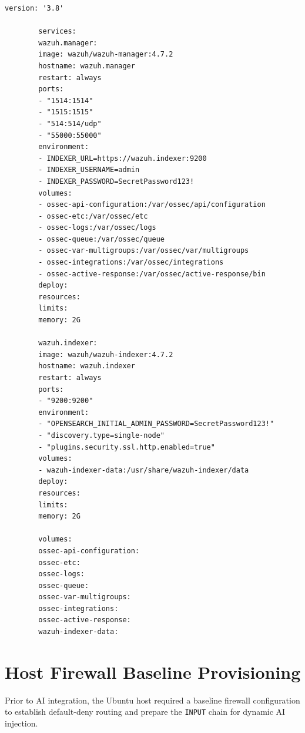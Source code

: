 \documentclass[12pt, a4paper]{report}
\begin{document}
	
	
	\begin{lstlisting}[language=XML, caption=Wazuh and OpenSearch Docker Compose Configuration Extract]
		version: '3.8'
		
		services:
		wazuh.manager:
		image: wazuh/wazuh-manager:4.7.2
		hostname: wazuh.manager
		restart: always
		ports:
		- "1514:1514"
		- "1515:1515"
		- "514:514/udp"
		- "55000:55000"
		environment:
		- INDEXER_URL=https://wazuh.indexer:9200
		- INDEXER_USERNAME=admin
		- INDEXER_PASSWORD=SecretPassword123!
		volumes:
		- ossec-api-configuration:/var/ossec/api/configuration
		- ossec-etc:/var/ossec/etc
		- ossec-logs:/var/ossec/logs
		- ossec-queue:/var/ossec/queue
		- ossec-var-multigroups:/var/ossec/var/multigroups
		- ossec-integrations:/var/ossec/integrations
		- ossec-active-response:/var/ossec/active-response/bin
		deploy:
		resources:
		limits:
		memory: 2G
		
		wazuh.indexer:
		image: wazuh/wazuh-indexer:4.7.2
		hostname: wazuh.indexer
		restart: always
		ports:
		- "9200:9200"
		environment:
		- "OPENSEARCH_INITIAL_ADMIN_PASSWORD=SecretPassword123!"
		- "discovery.type=single-node"
		- "plugins.security.ssl.http.enabled=true"
		volumes:
		- wazuh-indexer-data:/usr/share/wazuh-indexer/data
		deploy:
		resources:
		limits:
		memory: 2G
		
		volumes:
		ossec-api-configuration:
		ossec-etc:
		ossec-logs:
		ossec-queue:
		ossec-var-multigroups:
		ossec-integrations:
		ossec-active-response:
		wazuh-indexer-data:
	\end{lstlisting}
	
	\section{Host Firewall Baseline Provisioning}
	Prior to AI integration, the Ubuntu host required a baseline firewall configuration to establish default-deny routing and prepare the \texttt{INPUT} chain for dynamic AI injection.
	
\end{document}
